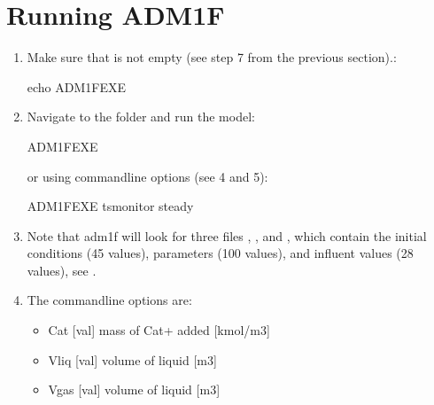 \documentclass[a4paper,10pt,english]{sphinxmanual}
\begin{document}
\chapter{Running ADM1F}
\label{\detokenize{compile:running-adm1f}}\begin{enumerate}
%
\item {} 
\sphinxAtStartPar
Make sure that  is not empty (see step 7 from the previous section).:

\begin{sphinxVerbatim}[commandchars=\\\{\}]
\PYGZdl{} echo \PYGZdl{}ADM1F\PYGZus{}EXE
\end{sphinxVerbatim}

\item {} 
\sphinxAtStartPar
Navigate to the  folder and run the model:

\begin{sphinxVerbatim}[commandchars=\\\{\}]
\PYGZdl{} \PYGZdl{}ADM1F\PYGZus{}EXE

or using command\PYGZhy{}line options (see 4 and 5):

\PYGZdl{} \PYGZdl{}ADM1F\PYGZus{}EXE \PYGZhy{}ts\PYGZus{}monitor \PYGZhy{}steady
\end{sphinxVerbatim}

\item {} 
\sphinxAtStartPar
Note that adm1f will look for three files , , and , which contain the initial conditions (45 values), parameters (100 values), and influent values (28 values), see {\hyperref[\detokenize{inouts:inouts-label}]{}}.

\item {} 
\sphinxAtStartPar
The command\sphinxhyphen{}line options are:
\begin{itemize}
\item {} 
\sphinxAtStartPar
\sphinxhyphen{}Cat {[}val{]} \sphinxhyphen{} mass of Cat+ added {[}kmol/m3{]}

\item {} 
\sphinxAtStartPar
\sphinxhyphen{}Vliq {[}val{]} \sphinxhyphen{} volume of liquid {[}m3{]}

\item {} 
\sphinxAtStartPar
\sphinxhyphen{}Vgas {[}val{]} \sphinxhyphen{} volume of liquid {[}m3{]}


\end{itemize}
\end{enumerate}
\end{document}

